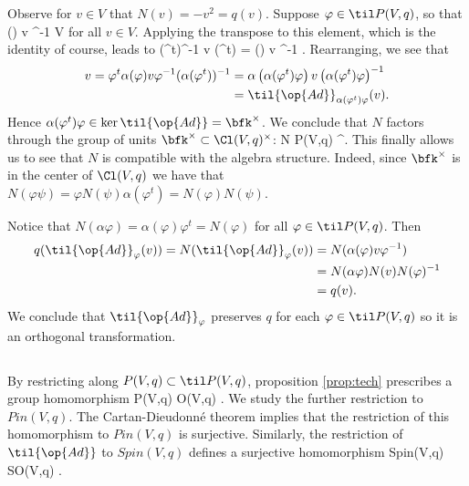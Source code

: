 \documentclass[../main.tex]{subfiles}
\begin{document}
Observe for $v \in V$ that $N(v) = -v^2 = q(v)$.
Suppose $\varphi \in \til P(V,q)$, so that
\beqn
\alpha(\varphi) v \varphi^{-1} \in V
\eeqn
for all $v\in V$.
Applying the transpose to this element, which is the identity of course, leads to 
\beqn
(\varphi^t)^{-1} v \alpha(\varphi^t) = \alpha(\varphi) v \varphi^{-1} .
\eeqn
Rearranging, we see that
\begin{align*}
v = \varphi^t \alpha(\varphi) v \varphi^{-1}(\alpha(\varphi^t))^{-1} & = \alpha \left(\alpha(\varphi^t) \varphi\right) v \left(\alpha(\varphi^t)\varphi\right)^{-1} \\ & = \til{\op{Ad}}_{\alpha(\varphi^t)\varphi}(v) .
\end{align*}
Hence $\alpha(\varphi^t) \varphi \in \ker \til{\op{Ad}} = \bfk^\times$.
We conclude that $N$ factors through the group of units $\bfk^\times \subset \Cl(V,q)^\times$:
\beqn
N \colon \til P(V,q) \to \bfk^\times .
\eeqn
This finally allows us to see that $N$ is compatible with the algebra structure.
Indeed, since $\bfk^\times$ is in the center of $\Cl(V,q)$ we have that $N(\varphi \psi) = \varphi N(\psi) \alpha(\varphi^t) = N(\varphi) N(\psi)$.

Notice that $N(\alpha \varphi) = \alpha(\varphi) \varphi^t = N(\varphi)$ for all $\varphi \in \til P(V,q)$.
Then 
\begin{align*}
q(\til{\op{Ad}}_{\varphi}(v)) = N(\til{\op{Ad}}_\varphi(v)) & = N(\alpha(\varphi) v \varphi^{-1}) \\ & = N(\alpha \varphi) N(v) N(\varphi)^{-1} \\ & = q(v) .
\end{align*}
We conclude that $\til{\op{Ad}}_\varphi$ preserves $q$ for each $\varphi \in \til P(V,q)$ so it is an orthogonal transformation.

\subsection{}

By restricting along $P(V,q) \subset \til P(V,q)$, proposition \ref{prop:tech} prescribes a group homomorphism
\beqn
{} \colon P(V,q) \to O(V,q) .
\eeqn
We study the further restriction to $Pin(V,q)$.
The Cartan-Dieudonn\'e theorem implies that the restriction of this homomorphism to $Pin(V,q)$ is surjective.
Similarly, the restriction of $\til{\op{Ad}}$ to $Spin(V,q)$ defines a surjective homomorphism
\beqn
{} \colon Spin(V,q) \to SO(V,q) .
\eeqn
\end{document}

